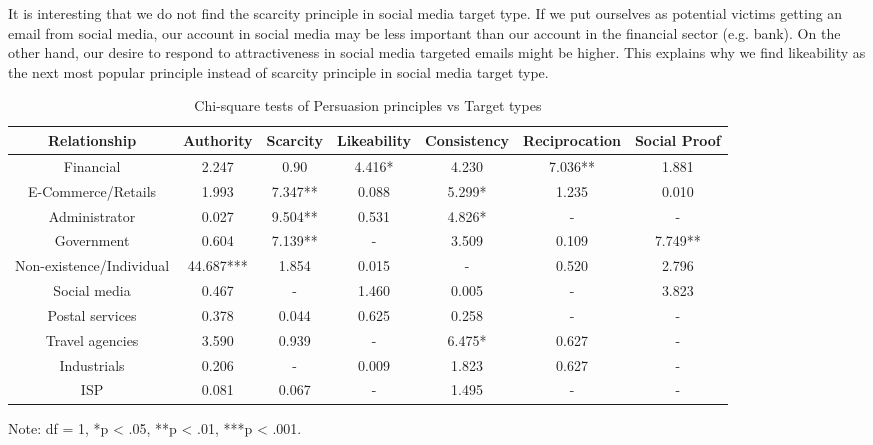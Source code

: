 It is interesting that we do not find the scarcity principle in social
media target type. If we put ourselves as potential victims getting
an email from social media, our account in social media may be less
important than our account in the financial sector (e.g. bank). On
the other hand, our desire to respond to attractiveness in social
media targeted emails might be higher. This explains why we find likeability
as the next most popular principle instead of scarcity principle in
social media target type.

\begin{minipage}[t]{1\columnwidth}%
\begin{longtable}{ccccccc}
\caption{{\scriptsize{}\label{tab:Chi-square-persuasion-principles}Chi-square
tests of Persuasion principles vs Target types}}
\tabularnewline
\toprule 
{\scriptsize{}Relationship} & {\scriptsize{}Authority} & {\scriptsize{}Scarcity} & {\scriptsize{}Likeability} & {\scriptsize{}Consistency} & {\scriptsize{}Reciprocation} & {\scriptsize{}Social Proof}\tabularnewline
\midrule
\midrule 
{\scriptsize{}Financial} & {\scriptsize{}2.247} & {\scriptsize{}0.90} & {\scriptsize{}4.416{*}} & {\scriptsize{}4.230} & {\scriptsize{}7.036{*}{*}} & {\scriptsize{}1.881}\tabularnewline
\midrule 
{\scriptsize{}E-Commerce/Retails} & {\scriptsize{}1.993} & {\scriptsize{}7.347{*}{*}} & {\scriptsize{}0.088} & {\scriptsize{}5.299{*}} & {\scriptsize{}1.235} & {\scriptsize{}0.010}\tabularnewline
\midrule 
{\scriptsize{}Administrator} & {\scriptsize{}0.027} & {\scriptsize{}9.504{*}{*}} & {\scriptsize{}0.531} & {\scriptsize{}4.826{*}} & {\scriptsize{}-} & {\scriptsize{}-}\tabularnewline
\midrule 
{\scriptsize{}Government} & {\scriptsize{}0.604} & {\scriptsize{}7.139{*}{*}} & {\scriptsize{}-} & {\scriptsize{}3.509} & {\scriptsize{}0.109} & {\scriptsize{}7.749{*}{*}}\tabularnewline
\midrule 
{\scriptsize{}Non-existence/Individual} & {\scriptsize{}44.687{*}{*}{*}} & {\scriptsize{}1.854} & {\scriptsize{}0.015} & {\scriptsize{}-} & {\scriptsize{}0.520} & {\scriptsize{}2.796}\tabularnewline
\midrule 
{\scriptsize{}Social media} & {\scriptsize{}0.467} & {\scriptsize{}-} & {\scriptsize{}1.460} & {\scriptsize{}0.005} & {\scriptsize{}-} & {\scriptsize{}3.823}\tabularnewline
\midrule 
{\scriptsize{}Postal services} & {\scriptsize{}0.378} & {\scriptsize{}0.044} & {\scriptsize{}0.625} & {\scriptsize{}0.258} & {\scriptsize{}-} & {\scriptsize{}-}\tabularnewline
\midrule 
{\scriptsize{}Travel agencies} & {\scriptsize{}3.590} & {\scriptsize{}0.939} & {\scriptsize{}-} & {\scriptsize{}6.475{*}} & {\scriptsize{}0.627} & {\scriptsize{}-}\tabularnewline
\midrule 
{\scriptsize{}Industrials} & {\scriptsize{}0.206} & {\scriptsize{}-} & {\scriptsize{}0.009} & {\scriptsize{}1.823} & {\scriptsize{}0.627} & {\scriptsize{}-}\tabularnewline
\midrule 
{\scriptsize{}ISP} & {\scriptsize{}0.081} & {\scriptsize{}0.067} & {\scriptsize{}-} & {\scriptsize{}1.495} & {\scriptsize{}-} & {\scriptsize{}-}\tabularnewline
\midrule
\end{longtable}

Note: df = 1, {*}p < .05, {*}{*}p < .01, {*}{*}{*}p < .001.%
\end{minipage}\\
